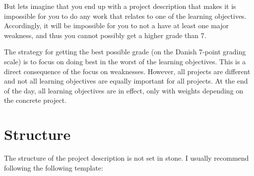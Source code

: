 \documentclass[a4paper, oneside]{memoir}
\newcommand{\idx}[1]{\index{#1}\marginpar{\raggedright \tiny #1}}
\begin{document}
But lets imagine that you end up with a project description that makes it is impossible for you to do any work that relates to one of the learning objectives. Accordingly, it will be impossible for you to not a have at least one major weakness, and thus you cannot possibly get a higher grade than 7.

The strategy for getting the best possible grade\idx{Grade} (on the Danish 7-point grading scale) is to focus on doing best in the worst of the learning objectives. This is a direct consequence of the focus on weaknesses. However, all projects are different and not all learning objectives are equally important for all projects. At the end of the day, all learning objectives are in effect, only with weights depending on the concrete project.

\section{Structure}

The structure of the project description is not set in stone. I usually recommend following the following template:
\end{document}

